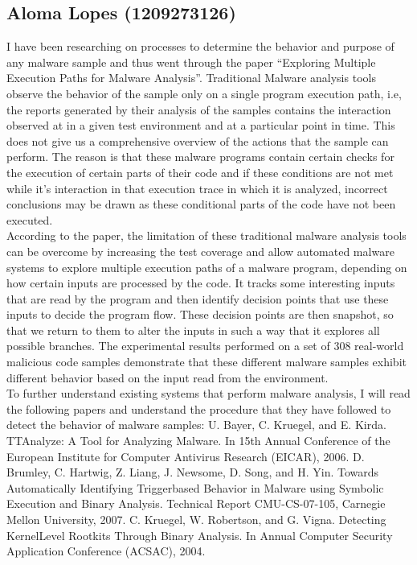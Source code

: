\documentclass[16pt]{article}
\begin{document}
		\subsection{Aloma Lopes (1209273126)}
		I have been researching on processes to determine the behavior and purpose of any malware sample and thus went through the paper “Exploring Multiple Execution Paths for Malware Analysis”. Traditional Malware analysis tools observe the behavior of the sample only on a single program execution path, i.e, the reports generated by their analysis of the samples contains the interaction observed at in a given test environment and at a particular point in time. This does not give us a comprehensive overview of the actions that the sample can perform. The reason is that these malware programs contain certain checks for the execution of certain parts of their code and if these conditions are not met while it’s interaction in that execution trace in which it is analyzed, incorrect conclusions may be drawn as these conditional parts of the code have not been executed.\\
		According to the paper, the limitation of these traditional malware analysis tools can be overcome by increasing the test coverage and allow automated malware systems to explore multiple execution paths of a malware program, depending on how certain inputs are processed by the code. It tracks some interesting inputs that are read by the program and then identify decision points that use these inputs to decide the program flow. These decision points are then snapshot, so that we return to them to alter the inputs in such a way that it explores all possible branches. The experimental results performed on a set of 308 real-world malicious code samples demonstrate that these different malware samples exhibit different behavior based on the input read from the environment.\\
		
		To further understand existing systems that perform malware analysis, I will read the following papers and understand the procedure that they have followed to detect the behavior of malware samples:
		U. Bayer, C. Kruegel, and E. Kirda. TTAnalyze: A Tool for Analyzing Malware. In 15th Annual Conference of the European Institute for Computer Antivirus Research (EICAR), 2006.
		D. Brumley, C. Hartwig, Z. Liang, J. Newsome, D. Song, and H. Yin. Towards Automatically Identifying Triggerbased Behavior in Malware using Symbolic Execution and Binary Analysis. Technical Report CMU-CS-07-105, Carnegie Mellon University, 2007.
		C. Kruegel, W. Robertson, and G. Vigna. Detecting KernelLevel Rootkits Through Binary Analysis. In Annual Computer Security Application Conference (ACSAC), 2004.
\end{document}
